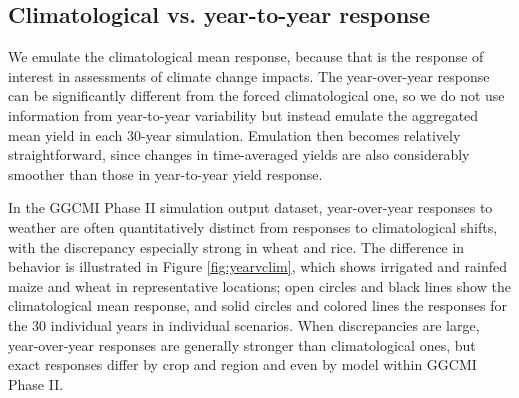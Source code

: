\documentclass[gmd, manuscript]{copernicus} %
\begin{document}
\subsection{Climatological vs. year-to-year response}

We emulate the climatological mean response, because that is the response of interest in assessments of climate change impacts. 
The year-over-year response can be significantly different from the forced climatological one, so we do not use information from year-to-year variability but instead emulate the aggregated mean yield in each 30-year simulation. 
Emulation then becomes relatively straightforward, since changes in time-averaged yields are also considerably smoother than those in year-to-year yield response.

In the GGCMI Phase II simulation output dataset, year-over-year responses to weather are often quantitatively distinct from responses to climatological shifts, with the discrepancy especially strong in wheat and rice. 
The difference in behavior is illustrated in Figure \ref{fig:yearvclim}, which shows irrigated and rainfed maize and wheat in representative locations; open circles and black lines show the climatological mean response, and solid circles and colored lines the responses for the 30 individual years in individual scenarios.
When discrepancies are large, year-over-year responses are generally stronger than climatological ones, but exact responses differ by crop and region and even by model within GGCMI Phase II. 
\end{document}
